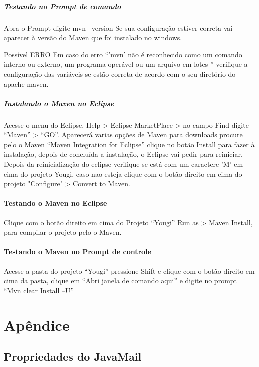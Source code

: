 \documentclass[envcountsame,envcountchap]{svmono}
\begin{document}
\subsubsection{Testando no Prompt de comando}

Abra o Prompt digite mvn –version
Se sua configuração estiver correta vai aparecer à versão do Maven que foi instalado no windows.
 
 	Possível ERRO
Em caso do erro “'mvn' não é reconhecido como um comando interno ou externo, um programa operável ou um arquivo em lotes ” verifique a configuração das variáveis se estão correta de acordo com o seu diretório do apache-maven.

\subsubsection{Instalando o Maven no Eclipse}
	Acesse o menu do Eclipse, Help > Eclipse MarketPlace > no campo Find digite “Maven” > “GO”. Aparecerá varias opções de Maven para downloads procure pelo o Maven “Maven Integration for Eclipse” clique no botão Install para fazer à instalação, depois de concluída a instalação, o Eclipse vai pedir para reiniciar.
	Depois da reinicialização do eclipse verifique se está com um caractere 'M' em cima do projeto Yougi, caso nao esteja clique com o botão direito em cima do projeto "Configure" > Convert to Maven.

\subsection {Testando o Maven no Eclipse}

Clique com o botão direito em cima do Projeto “Yougi” Run as > Maven Install, para compilar o projeto pelo o Maven. 

\subsection {Testando o Maven no Prompt de controle}

Acesse a pasta do projeto “Yougi” pressione Shift e clique com o botão direito em cima da pasta, clique em “Abri janela de comando aqui” e digite no prompt “Mvn clear Install –U”

\part*{Apêndice}

\chapter*{Propriedades do JavaMail}
\end{document}
